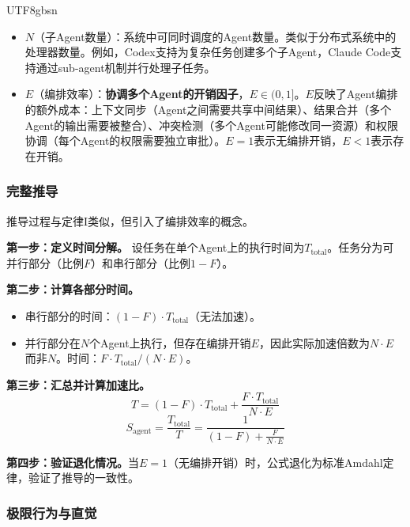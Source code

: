 \documentclass[11pt,a4paper]{article}
\begin{document}
\begin{CJK*}{UTF8}{gbsn}
\begin{itemize}[nosep]
\item $N$（子Agent数量）：系统中可同时调度的Agent数量。类似于分布式系统中的处理器数量。例如，Codex支持为复杂任务创建多个子Agent\cite{openai_codex_subagents_2026}，Claude Code支持通过sub-agent机制并行处理子任务\cite{anthropic_claudecode_subagents_2026}。

\item $E$（编排效率）：\textbf{协调多个Agent的开销因子}，$E \in (0, 1]$。$E$反映了Agent编排的额外成本：上下文同步（Agent之间需要共享中间结果）、结果合并（多个Agent的输出需要被整合）、冲突检测（多个Agent可能修改同一资源）和权限协调（每个Agent的权限需要独立审批）。$E = 1$表示无编排开销，$E < 1$表示存在开销。
\end{itemize}

\subsubsection{完整推导}

推导过程与定律I类似，但引入了编排效率的概念。

\textbf{第一步：定义时间分解。}
设任务在单个Agent上的执行时间为$T_{\mathrm{total}}$。任务分为可并行部分（比例$F$）和串行部分（比例$1-F$）。

\textbf{第二步：计算各部分时间。}
\begin{itemize}[nosep]
\item 串行部分的时间：$(1-F) \cdot T_{\mathrm{total}}$（无法加速）。
\item 并行部分在$N$个Agent上执行，但存在编排开销$E$，因此实际加速倍数为$N \cdot E$而非$N$。时间：$F \cdot T_{\mathrm{total}} / (N \cdot E)$。
\end{itemize}

\textbf{第三步：汇总并计算加速比。}
\begin{equation}
T = (1-F) \cdot T_{\mathrm{total}} + \frac{F \cdot T_{\mathrm{total}}}{N \cdot E}
\end{equation}
\begin{equation}
S_{\mathrm{agent}} = \frac{T_{\mathrm{total}}}{T} = \frac{1}{(1-F) + \frac{F}{N \cdot E}}
\end{equation}

\textbf{第四步：验证退化情况。}当$E = 1$（无编排开销）时，公式退化为标准Amdahl定律，验证了推导的一致性。

\subsubsection{极限行为与直觉}


\end{CJK*}
\end{document}
